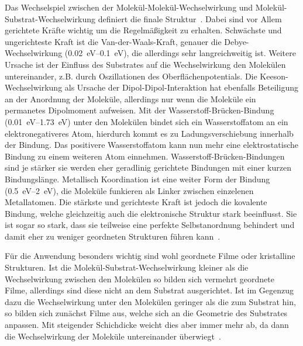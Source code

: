             Das Wechselspiel zwischen der Molekül-Molekül-Wechselwirkung und Molekül-Substrat-Wechselwirkung definiert die finale Struktur~\cite{IF_1}.
            Dabei sind vor Allem gerichtete Kräfte wichtig um die Regelmäßigkeit zu erhalten.
            Schwächste und ungerichteste Kraft ist die Van-der-Waals-Kraft, genauer die Debye-Wechselwirkung (\SIrange{0.02}{0.1}{\electronvolt}), die allerdings sehr langreichweitig ist.
            Weitere Ursache ist der Einfluss des Substrates auf die Wechselwirkung den Molekülen untereinander, z.B. durch Oszillationen des Oberflächenpotentials.
            Die Keeson-Wechselwirkung als Ursache der Dipol-Dipol-Interaktion hat ebenfalls Beteiligung an der Anordnung der Moleküle, allerdings nur wenn die Moleküle ein permanetes Dipolmoment aufweisen.
            Mit der Wasserstoff-Brücken-Bindung (\SIrange{0.01}{1.73}{\electronvolt}) unter den Molekülen bindet sich ein Wasserstoffatom an ein elektronegativeres Atom, hierdurch kommt es zu Ladungsverschiebung innerhalb der Bindung.
            Das positivere Wasserstoffatom kann nun mehr eine elektrostatische Bindung zu einem weiteren Atom einnehmen.
            Wasserstoff-Brücken-Bindungen sind je stärker sie werden eher geradlinig gerichtete Bindungen mit einer kurzen Bindungslänge.
            Metallisch Koordination ist eine weiter Form der Bindung (\SIrange{0.5}{2}{\electronvolt}), die Moleküle funkieren als Linker zwischen einzelenen Metallatomen.
            Die stärkste und gerichteste Kraft ist jedoch die kovalente Bindung, welche gleichzeitig auch die elektronische Struktur stark beeinflusst.
            Sie ist sogar so stark, dass sie teilweise eine perfekte Selbstanordnung behindert und damit eher zu weniger geordneten Strukturen führen kann~\cite{IF_1}.

            Für die Anwendung besonders wichtig sind wohl geordnete Filme oder kristalline Strukturen.
            Ist die Molekül-Substrat-Wechselwirkung kleiner als die Wechselwirkung zwischen den Molekülen so bilden sich vermehrt geordnete Filme, allerdings sind diese nicht an dem Substrat ausgerichtet.
            Ist im Gegenzug dazu die Wechselwirkung unter den Molekülen geringer als die zum Substrat hin, so bilden sich zunächst Filme aus, welche sich an die Geometrie des Substrates anpassen.
            Mit steigender Schichdicke weicht dies aber immer mehr ab, da dann die Wechselwirkung der Moleküle untereinander überwiegt~\cite{5A_9}.

